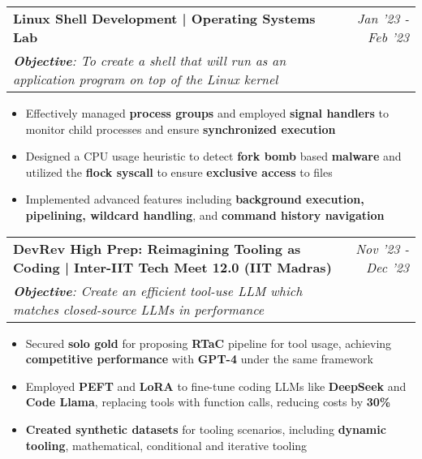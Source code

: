 \documentclass[a4paper,11pt]{article}
\makeatletter
\newcommand{\resumeProject}[4]{
\vspace{0.5mm}\item
    \begin{tabular*}{0.98\textwidth}[t]{l@{\extracolsep{\fill}}r}
        \textbf{#1} & \textit{\footnotesize{#3}} \\
        \footnotesize{\textit{#2}} & \footnotesize{#4}
    \end{tabular*}
    \vspace{-2.4mm}
}
\newcommand{\resumeItemListStart}{\begin{justify}\begin{itemize}[leftmargin=3ex, rightmargin=2ex, noitemsep,labelsep=1.2mm,itemsep=0mm]\small}
\newcommand{\resumeItemListEnd}{\end{itemize}\end{justify}\vspace{-2mm}}
\makeatother
\begin{document}
\resumeProject
{Linux Shell Development | Operating Systems Lab}
{\textbf{Objective}: To create a shell that will run as an application program on top of the Linux kernel}
{Jan '23 - Feb '23}
{}
\resumeItemListStart
\item {Effectively managed \textbf{process groups} and employed \textbf{signal handlers} to monitor child processes and ensure \textbf{synchronized execution}}
\item {Designed a CPU usage heuristic to detect \textbf{fork bomb} based \textbf{malware} and utilized the \textbf{flock syscall} to ensure \textbf{exclusive access} to files}
\item {Implemented advanced features including \textbf{background execution, pipelining, wildcard handling}, and \textbf{command history navigation}}
\resumeItemListEnd

\resumeProject
{DevRev High Prep: Reimagining Tooling as Coding | Inter-IIT Tech Meet 12.0 (IIT Madras)}
{\textbf{Objective}: Create an efficient tool-use LLM which matches closed-source LLMs in performance}
{Nov '23 - Dec '23}
{}
\resumeItemListStart
\item Secured \textbf{solo gold} for proposing \textbf{RTaC} pipeline for tool usage, achieving \textbf{competitive performance} with \textbf{GPT-4} under the same framework
\item Employed \textbf{PEFT} and \textbf{LoRA} to fine-tune coding LLMs like \textbf{DeepSeek} and \textbf{Code Llama}, replacing tools with function calls, reducing costs by \textbf{30\%}
\item \textbf{Created synthetic datasets} for tooling scenarios, including \textbf{dynamic tooling}, mathematical, conditional and iterative tooling
\resumeItemListEnd

\end{document}
